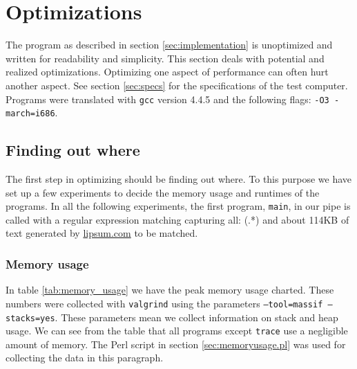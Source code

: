 \section{Optimizations}
\label{sec:optimizations}
The program as described in section \vref{sec:implementation} is
unoptimized and written for readability and simplicity. This section
deals with potential and realized optimizations. Optimizing one aspect
of performance can often hurt another aspect. See section
\vref{sec:specs} for the specifications of the test computer. Programs
were translated with \texttt{gcc} version 4.4.5 and the following flags:
\texttt{-O3 -march=i686}.

\subsection{Finding out where}
\label{sec:finding_out_where}
The first step in optimizing should be finding out where. To this
purpose we have set up a few experiments to decide the memory usage
and runtimes of the programs. In all the following experiments, the
first program, \texttt{main}, in our pipe is called with a regular
expression matching capturing all: \textsf{(.*)} and about 114KB of
text generated by \url{lipsum.com} to be matched. 


\subsubsection{Memory usage}
In table \vref{tab:memory_usage} we have the peak memory usage
charted. These numbers were collected with \texttt{valgrind} using the
parameters \texttt{--tool=massif --stacks=yes}. These parameters mean
we collect information on stack and heap usage. We can see from the
table that all programs except \texttt{trace} use a negligible amount
of memory. The Perl script in section \vref{sec:memoryusage.pl} was
used for collecting the data in this paragraph.

